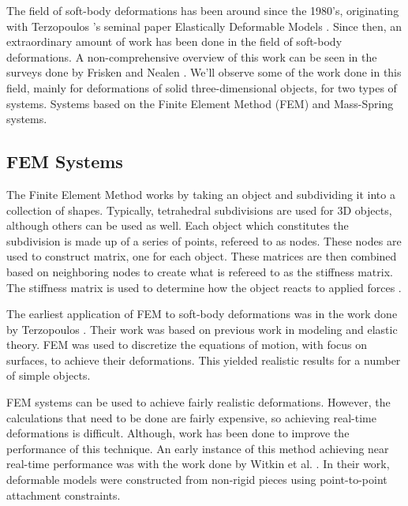 The field of soft-body deformations has been around since the 1980's, originating with Terzopoulos
\etal's seminal paper Elastically Deformable Models \cite{Elastically-Deformable-Models}. Since 
then, an extraordinary amount of work has been done in the field of soft-body deformations. A 
non-comprehensive overview of this work can be seen in the surveys done by Frisken \etal 
\cite{A-Survey-of-Deformable-Modeling-in-Computer-Graphics} and Nealen \etal
\cite{Phyiscally-Based-Deformable-Models-in-Computer-Graphics}.
We'll observe some of the work done in this field, mainly for deformations of solid 
three-dimensional objects, for two types of systems. Systems based on the Finite Element Method 
(FEM) and Mass-Spring systems. 

\subsection{FEM Systems}

The Finite Element Method works by taking an object and subdividing it into a collection of shapes.
Typically, tetrahedral subdivisions are used for 3D objects, although others can be used as well.
Each object which constitutes the subdivision is made up of a series of points, refereed to as nodes.
These nodes are used to construct matrix, one for each object. These matrices are then combined 
based on neighboring nodes to create what is refereed to as the stiffness matrix. The stiffness 
matrix is used to determine how the object reacts to applied forces \cite{FEM-Explenation}.

The earliest application of FEM to soft-body deformations was in the work done by Terzopoulos \etal
\cite{Elastically-Deformable-Models}. Their work was based on previous work in modeling and 
elastic theory. FEM was used to discretize the equations of motion, with 
focus on surfaces, to achieve their deformations. This yielded realistic results for a number of 
simple objects. 

FEM systems can be used to achieve fairly realistic deformations. However, the calculations that 
need to be done are fairly expensive, so achieving real-time deformations is difficult. Although,
work has been done to improve the performance of this technique.
An early instance of this method achieving near real-time performance was with the work done by 
Witkin et al. \cite{Fast-Animation-and-Control-of-Nonrigid-Structures}. In their work, deformable 
models were constructed from non-rigid pieces using point-to-point attachment constraints. 

